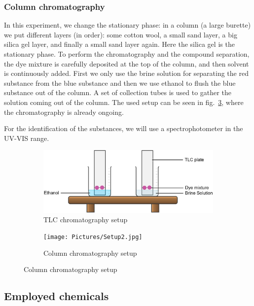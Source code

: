 \documentclass{article}
\begin{document}
\subsubsection{Column chromatography}

In this experiment, we change the stationary phase: in a column (a large burette) we put different layers (in order): some cotton wool, a small sand layer, a big silica gel layer, and finally a small sand layer again. Here the silica gel is the stationary phase. To perform the chromatography and the compound separation, the dye mixture is carefully deposited at the top of the column, and then solvent is continuously added. First we only use the brine solution for separating the red substance from the blue substance and then we use ethanol to flush the blue substance out of the column. A set of collection tubes is used to gather the solution coming out of the column. The used setup can be seen in fig.~\ref{fig:setup2}, where the chromatography is already ongoing.

For the identification of the substances, we will use a spectrophotometer in the UV-VIS range.

\begin{figure}[!ht]
    \centering
    \begin{subfigure}{0.49\textwidth}
        \centering
        \includegraphics[width=\textwidth]{Pictures/Setup1.jpg}
        \caption{TLC chromatography setup}
        \label{fig:setup1}
    \end{subfigure} 
    \begin{subfigure}{0.49\textwidth}
        \centering
        \texttt{[image: Pictures/Setup2.jpg]}
        \caption{Column chromatography setup}
        \label{fig:setup2}
    \end{subfigure} 
\end{figure}
\FloatBarrier

\subsection{Employed chemicals}
\end{document}

